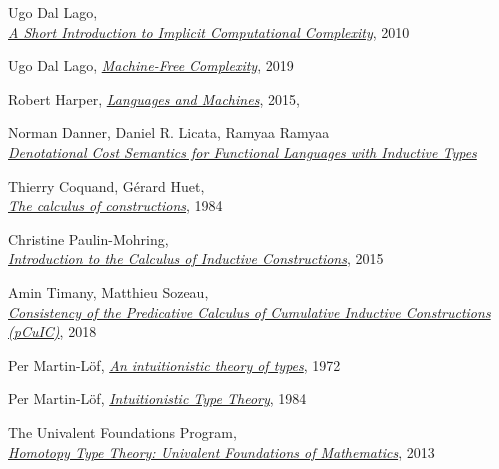 \documentclass[declaration,mgr,english,shortabstract]{iithesis}
\begin{document}
\begin{thebibliography}{1}
    Ugo Dal Lago, \\
    \href{http://cs.unibo.it/~dallago/FICQRA/esslli.pdf}{\textit{A Short Introduction to Implicit Computational Complexity}}, 2010

    Ugo Dal Lago,
    \href{https://caleidoscope.sciencesconf.org/data/DalLago_caleidoscopeslides.pdf}{\textit{Machine-Free Complexity}},
    2019

    Robert Harper,
    \href{https://existentialtype.wordpress.com/2011/03/16/languages-and-machines/}{\textit{Languages and Machines}}, 2015, \\

    Norman Danner, Daniel R. Licata, Ramyaa Ramyaa \\
    \href{https://dlicata.wescreates.wesleyan.edu/pubs/dlr15inductive/dlr15inductive.pdf}{\textit{Denotational Cost Semantics for Functional Languages with Inductive Types}}

    Thierry Coquand, Gérard Huet, \\
    \href{https://www.sciencedirect.com/science/article/pii/0890540188900053}{\textit{The calculus of constructions}}, 1984

    Christine Paulin-Mohring, \\
    \href{https://hal.inria.fr/hal-01094195/document}{\textit{Introduction to the Calculus of Inductive Constructions}}, 2015

    Amin Timany, Matthieu Sozeau, \\
    \href{https://hal.inria.fr/hal-01615123v2/document}{\textit{Consistency of the Predicative Calculus of Cumulative Inductive Constructions (pCuIC)}}, 2018

    Per Martin-L\"{o}f,
    \href{https://archive-pml.github.io/martin-lof/pdfs/An-Intuitionistic-Theory-of-Types-1972.pdf}{\textit{An intuitionistic theory of types}}, 1972

    Per Martin-L\"{o}f,
    \href{https://archive-pml.github.io/martin-lof/pdfs/Bibliopolis-Book-retypeset-1984.pdf}{\textit{Intuitionistic Type Theory}}, 1984

    The Univalent Foundations Program, \\
    \href{https://homotopytypetheory.org/book/}{\textit{Homotopy Type Theory: Univalent Foundations of Mathematics}},
    2013


\end{thebibliography}
\end{document}

